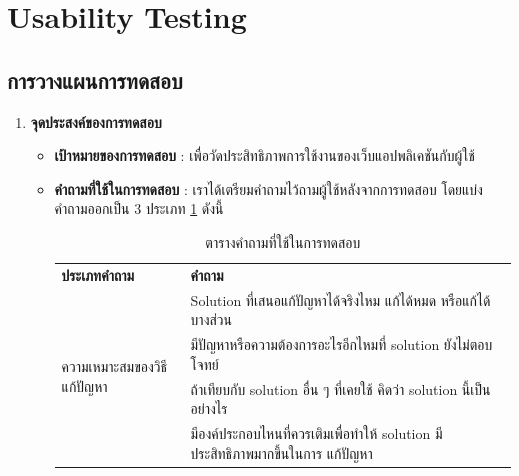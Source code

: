 \section{Usability Testing}
\subsection{การวางแผนการทดสอบ}
\begin{enumerate}
    \item \textbf{จุดประสงค์ของการทดสอบ}
          \begin{itemize}
              \item \textbf{เป้าหมายของการทดสอบ} : เพื่อวัดประสิทธิภาพการใช้งานของเว็บแอปพลิเคชันกับผู้ใช้
              \item \textbf{คำถามที่ใช้ในการทดสอบ} : เราได้เตรียมคำถามไว้ถามผู้ใช้หลังจากการทดสอบ โดยแบ่งคำถามออกเป็น 3 ประเภท \ref{tab:question-table} ดังนี้
                    \begin{table}[H]
                        \caption{ตารางคำถามที่ใช้ในการทดสอบ}
                        \label{tab:question-table}
                        \begin{tabularx}{\textwidth}{|l|>{\raggedright\arraybackslash}X|}
                            \cline{1-2}
                            \textbf{ประเภทคำถาม}                        & \textbf{คำถาม}                                                                  \\ \cline{1-2}
                            \multirow[t]{5}{*}{ความเหมาะสมของวิธีแก้ปัญหา} & Solution ที่เสนอแก้ปัญหาได้จริงไหม แก้ได้หมด หรือแก้ได้บางส่วน                             \\ \cline{2-2}
                                                                       & มีปัญหาหรือความต้องการอะไรอีกไหมที่ solution ยังไม่ตอบโจทย์                              \\ \cline{2-2}
                                                                       & ถ้าเทียบกับ solution อื่น ๆ ที่เคยใช้ คิดว่า solution นี้เป็นอย่างไร                         \\ \cline{2-2}
                                                                       & มีองค์ประกอบไหนที่ควรเติมเพื่อทำให้ solution มีประสิทธิภาพมากขึ้นในการ แก้ปัญหา                \\ \cline{2-2}

\end{tabularx}
\end{table}
\end{itemize}
\end{enumerate}
